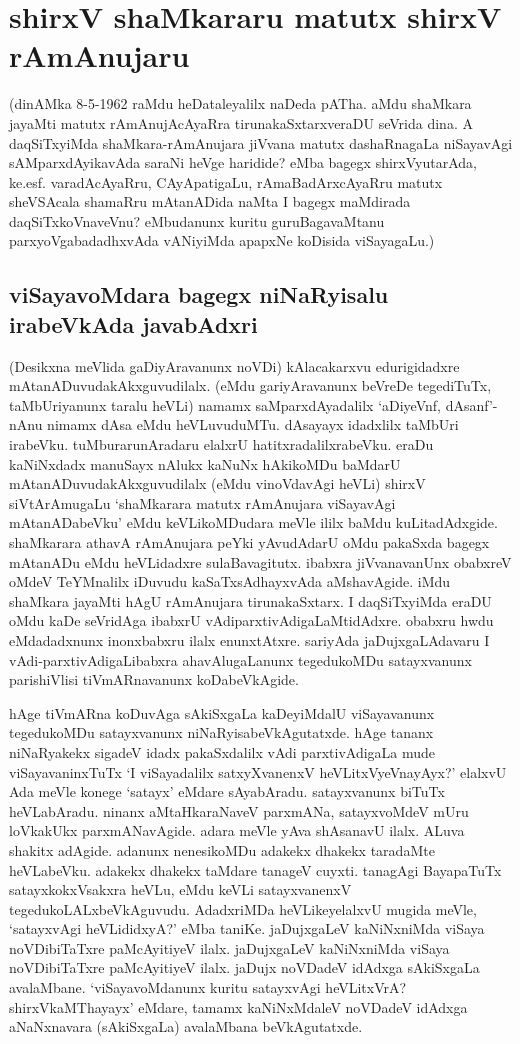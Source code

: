 \chapter{shirxV shaMkararu matutx shirxV rAmAnujaru}

(dinAMka 8-5-1962 raMdu heDataleyalilx naDeda pATha. aMdu shaMkara jayaMti matutx rAmAnujAcAyaRra tirunakaSxtarxveraDU seVrida dina. A daqSiTxyiMda shaMkara-rAmAnujara jiVvana matutx dashaRnagaLa niSayavAgi sAMparxdAyikavAda saraNi heVge haridide? eMba bagegx  shirxVyutarAda, ke.esf. varadAcAyaRru, CAyApatigaLu, rAmaBadArxcAyaRru matutx sheVSAcala shamaRru mAtanADida naMta I bagegx   maMdirada daqSiTxkoVnaveVnu? eMbudanunx kuritu guruBagavaMtanu parxyoVgabadadhxvAda vANiyiMda apapxNe koDisida viSayagaLu.)

\section*{viSayavoMdara bagegx niNaRyisalu irabeVkAda javabAdxri}

(Desikxna meVlida gaDiyAravanunx noVDi) kAlacakarxvu edurigidadxre mAtanADuvudakAkxguvudilalx. (eMdu gariyAravanunx beVreDe tegediTuTx, taMbUriyanunx taralu heVLi) namamx saMparxdAyadalilx `aDiyeVnf, dAsanf'-nAnu nimamx dAsa eMdu heVLuvuduMTu. dAsayayx  idadxlilx taMbUri irabeVku. tuMburarunAradaru elalxrU hatitxradalilxrabeVku. eraDu kaNiNxdadx manuSayx nAlukx kaNuNx hAkikoMDu baMdarU mAtanADuvudakAkxguvudilalx (eMdu vinoVdavAgi heVLi) shirxV siVtArAmugaLu `shaMkarara matutx rAmAnujara viSayavAgi mAtanADabeVku' eMdu keVLikoMDudara meVle ililx baMdu kuLitadAdxgide. shaMkarara athavA rAmAnujara peYki yAvudAdarU oMdu pakaSxda bagegx mAtanADu eMdu heVLidadxre sulaBavagitutx. ibabxra jiVvanavanUnx obabxreV oMdeV TeYMnalilx iDuvudu kaSaTxsAdhayxvAda aMshavAgide. iMdu shaMkara jayaMti hAgU rAmAnujara tirunakaSxtarx. I daqSiTxyiMda eraDU oMdu kaDe seVridAga ibabxrU vAdiparxtivAdigaLaMtidAdxre. obabxru hwdu eMdadadxnunx inonxbabxru ilalx enunxtAtxre. sariyAda jaDujxgaLAdavaru I vAdi-parxtivAdigaLibabxra ahavAlugaLanunx tegedukoMDu satayxvanunx parishiVlisi tiVmARnavanunx koDabeVkAgide.

hAge tiVmARna koDuvAga sAkiSxgaLa kaDeyiMdalU viSayavanunx tegedukoMDu satayxvanunx niNaRyisabeVkAgutatxde. hAge tananx niNaRyakekx sigadeV idadx pakaSxdalilx vAdi parxtivAdigaLa mude viSayavaninxTuTx `I viSayadalilx satxyXvanenxV heVLitxVyeVnayAyx?' elalxvU Ada meVle konege `satayx' eMdare sAyabAradu. satayxvanunx biTuTx heVLabAradu. ninanx aMtaHkaraNaveV parxmANa, satayxvoMdeV mUru loVkakUkx parxmANavAgide. adara meVle yAva shAsanavU ilalx. ALuva shakitx adAgide. adanunx nenesikoMDu adakekx dhakekx taradaMte heVLabeVku. adakekx dhakekx taMdare tanageV cuyxti. tanagAgi BayapaTuTx satayxkokxVsakxra heVLu, eMdu keVLi satayxvanenxV tegedukoLALxbeVkAguvudu. AdadxriMDa heVLikeyelalxvU mugida meVle, `satayxvAgi heVLididxyA?' eMba taniKe. jaDujxgaLeV kaNiNxniMda viSaya noVDibiTaTxre paMcAyitiyeV ilalx. jaDujxgaLeV kaNiNxniMda viSaya noVDibiTaTxre paMcAyitiyeV ilalx. jaDujx noVDadeV idAdxga sAkiSxgaLa avalaMbane. `viSayavoMdanunx kuritu satayxvAgi heVLitxVrA? shirxVkaMThayayx' eMdare, tamamx kaNiNxMdaleV noVDadeV idAdxga aNaNxnavara (sAkiSxgaLa) avalaMbana beVkAgutatxde.

